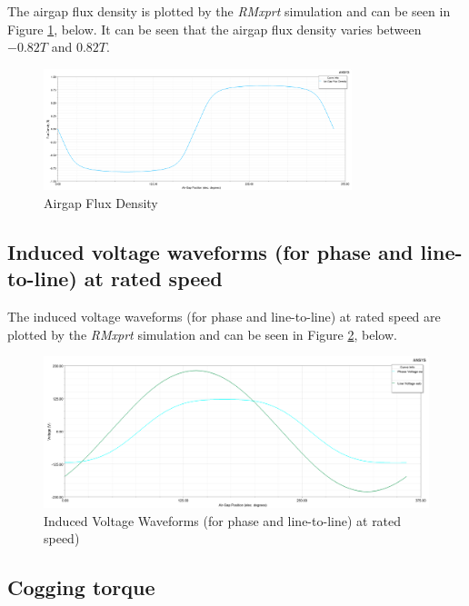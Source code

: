 \documentclass[a4paper, 11pt]{article}
\begin{document}
The airgap flux density is plotted by the \textit{RMxprt} simulation and can be seen in Figure \ref{fig:Q3_airgapFluxDensity}, below. It can be seen that the airgap flux density varies between $-0.82T$ and $0.82T$.

\begin{figure}[h!]
    \centering
	\begin{center}
		\includegraphics[width=0.8\textwidth]{Q3_airgapFluxDensity.png}
	\end{center}
	\caption{Airgap Flux Density}
	\label{fig:Q3_airgapFluxDensity}
\end{figure}

\subsection{Induced voltage waveforms (for phase and line-to-line) at rated speed}


The induced voltage waveforms (for phase and line-to-line) at rated speed are plotted by the \textit{RMxprt} simulation and can be seen in Figure \ref{fig:Q3_inducedVoltageWaveforms}, below.
\begin{figure}[h!]
    \centering
	\begin{center}
		\includegraphics[width=1.0\textwidth]{Q3_inducedVoltageWaveforms}
	\end{center}
	\caption{Induced Voltage Waveforms (for phase and line-to-line) at rated speed)}
	\label{fig:Q3_inducedVoltageWaveforms}
\end{figure}


\subsection{Cogging torque}
\end{document}

